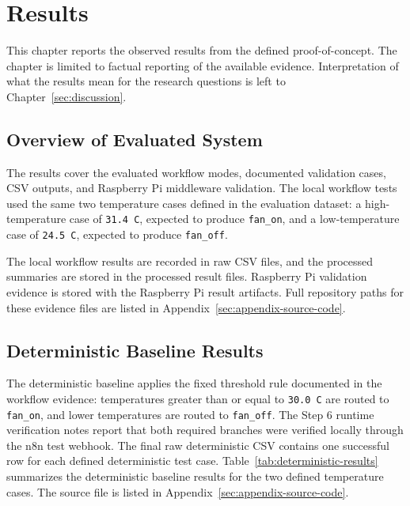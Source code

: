 \section{Results}\label{sec:results}

This chapter reports the observed results from the defined proof-of-concept. The chapter is limited to factual reporting of the available evidence. Interpretation of what the results mean for the research questions is left to Chapter~\ref{sec:discussion}.

\subsection{Overview of Evaluated System}\label{subsec:results-overview}

The results cover the evaluated workflow modes, documented validation cases, CSV outputs, and Raspberry Pi middleware validation. The local workflow tests used the same two temperature cases defined in the evaluation dataset: a high-temperature case of \texttt{31.4 C}, expected to produce \texttt{fan\_on}, and a low-temperature case of \texttt{24.5 C}, expected to produce \texttt{fan\_off}.

The local workflow results are recorded in raw CSV files, and the processed summaries are stored in the processed result files. Raspberry Pi validation evidence is stored with the Raspberry Pi result artifacts. Full repository paths for these evidence files are listed in Appendix~\ref{sec:appendix-source-code}.

\subsection{Deterministic Baseline Results}\label{subsec:results-deterministic}

The deterministic baseline applies the fixed threshold rule documented in the workflow evidence: temperatures greater than or equal to \texttt{30.0 C} are routed to \texttt{fan\_on}, and lower temperatures are routed to \texttt{fan\_off}. The Step 6 runtime verification notes report that both required branches were verified locally through the n8n test webhook. The final raw deterministic CSV contains one successful row for each defined deterministic test case. Table~\ref{tab:deterministic-results} summarizes the deterministic baseline results for the two defined temperature cases. The source file is listed in Appendix~\ref{sec:appendix-source-code}.

